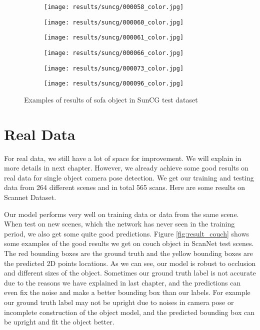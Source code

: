 \begin{figure}[h!]
\begin{subfigure}[b]{0.32\linewidth}
    \texttt{[image: results/suncg/000058\_color.jpg]}
  \end{subfigure}
  \begin{subfigure}[b]{0.32\linewidth}
    \texttt{[image: results/suncg/000060\_color.jpg]}
  \end{subfigure}
  \begin{subfigure}[b]{0.32\linewidth}
    \texttt{[image: results/suncg/000061\_color.jpg]}
  \end{subfigure}
  \begin{subfigure}[b]{0.32\linewidth}
    \texttt{[image: results/suncg/000066\_color.jpg]}
  \end{subfigure}
  \begin{subfigure}[b]{0.32\linewidth}
    \texttt{[image: results/suncg/000073\_color.jpg]}
  \end{subfigure}
  \begin{subfigure}[b]{0.32\linewidth}
    \texttt{[image: results/suncg/000096\_color.jpg]}
  \end{subfigure}
  \caption{Examples of results of sofa object in SunCG test dataset}
  \label{fig:suncg}
\end{figure}

\section{Real Data}
For real data, we still have a lot of space for improvement. We will explain in more details in next chapter. However, we already achieve some good results on real data for single object camera pose detection. We get our training and testing data from 264 different scenes and in total 565 scans. Here are some results on Scannet Dataset.

Our model performs very well on training data or data from the same scene. When test on new scenes, which the network has never seen in the training period, we also get some quite good predictions. Figure \ref{fig:result_couch} shows some examples of the good results we get on couch object in ScanNet test scenes. The red bounding boxes are the ground truth and the yellow bounding  boxes are the predicted 2D points locations. As we can see, our model is robust to occlusion and different sizes of the object. Sometimes our ground truth label is not accurate due to the reasons we have explained in last chapter, and the predictions can even fix the noise and make a better bounding box than our labels. For example our ground truth label may not be upright due to noises in camera pose or incomplete construction of the object model, and the predicted bounding box can be upright and fit the object better.

